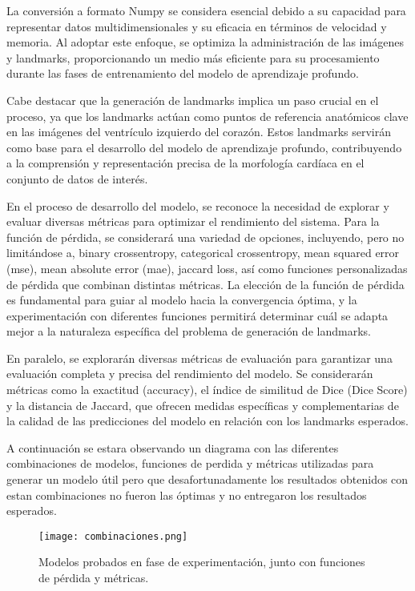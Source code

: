 \documentclass[runningheads]{llncs}
\begin{document}
La conversión a formato Numpy se considera esencial debido a su capacidad para representar datos multidimensionales y su eficacia en términos de velocidad y memoria. Al adoptar este enfoque, se optimiza la administración de las imágenes y landmarks, proporcionando un medio más eficiente para su procesamiento durante las fases de entrenamiento del modelo de aprendizaje profundo.

Cabe destacar que la generación de landmarks implica un paso crucial en el proceso, ya que los landmarks actúan como puntos de referencia anatómicos clave en las imágenes del ventrículo izquierdo del corazón. Estos landmarks servirán como base para el desarrollo del modelo de aprendizaje profundo, contribuyendo a la comprensión y representación precisa de la morfología cardíaca en el conjunto de datos de interés.

En el proceso de desarrollo del modelo, se reconoce la necesidad de explorar y evaluar diversas métricas para optimizar el rendimiento del sistema. Para la función de pérdida, se considerará una variedad de opciones, incluyendo, pero no limitándose a, binary crossentropy, categorical crossentropy, mean squared error (mse), mean absolute error (mae), jaccard loss, así como funciones personalizadas de pérdida que combinan distintas métricas. La elección de la función de pérdida es fundamental para guiar al modelo hacia la convergencia óptima, y la experimentación con diferentes funciones permitirá determinar cuál se adapta mejor a la naturaleza específica del problema de generación de landmarks.

En paralelo, se explorarán diversas métricas de evaluación para garantizar una evaluación completa y precisa del rendimiento del modelo. Se considerarán métricas como la exactitud (accuracy), el índice de similitud de Dice (Dice Score) y la distancia de Jaccard, que ofrecen medidas específicas y complementarias de la calidad de las predicciones del modelo en relación con los landmarks esperados.

A continuación se estara observando un diagrama con las diferentes combinaciones de modelos, funciones de perdida y métricas utilizadas para generar un modelo útil pero que desafortunadamente los resultados obtenidos con estan combinaciones no fueron las óptimas y no entregaron los resultados esperados.

\begin{figure} [H]
    \centering
    \texttt{[image: combinaciones.png]}
    \caption{Modelos probados en fase de experimentación, junto con funciones de pérdida y métricas.}
    \label{fig:enter-label}
\end{figure}
\end{document}
